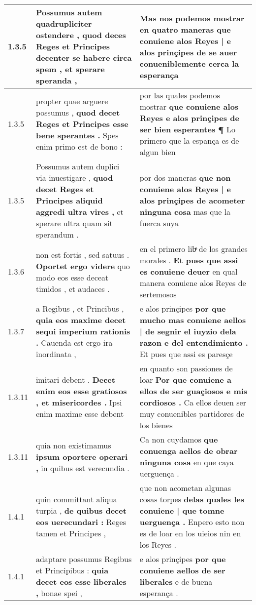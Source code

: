 \begin{tabular}{|p{1cm}|p{6.5cm}|p{6.5cm}|}
1.3.5 & Possumus autem quadrupliciter ostendere , \textbf{ quod deces Reges et Principes decenter se habere circa spem , } et sperare speranda , & Mas nos podemos mostrar en quatro maneras \textbf{ que conuiene alos Reyes | e alos prinçipes de se auer } conueniblemente cerca la esperança \\\hline
1.3.5 & propter quae arguere possumus , \textbf{ quod decet Reges et Principes esse bene sperantes . } Spes enim primo est de bono : & por las quales podemos mostrar \textbf{ que conuiene alos Reyes e alos prinçipes de ser bien esperantes ¶ } Lo primero que la espança es de algun bien \\\hline
1.3.5 & Possumus autem duplici via inuestigare , \textbf{ quod decet Reges et Principes aliquid aggredi ultra vires , } et sperare ultra quam sit sperandum . & por dos maneras \textbf{ que non conuiene alos Reyes | e alos prinçipes de acometer ninguna cosa } mas que la fuerca suya \\\hline
1.3.6 & non est fortis , sed satuus . \textbf{ Oportet ergo videre } quo modo eos esse deceat timidos , et audaces . & en el primero libͤ de los grandes morales . \textbf{ Et pues que assi es conuiene deuer } en qual manera conuiene alos Reyes de sertemosos \\\hline
1.3.7 & a Regibus , et Princibus , \textbf{ quia eos maxime decet sequi imperium rationis . } Cauenda est ergo ira inordinata , & e alos prinçipes \textbf{ por que mucho mas conuiene aellos | de segnir el iuyzio dela razon e del entendimiento . } Et pues que assi es paresçe \\\hline
1.3.11 & imitari debent . \textbf{ Decet enim eos esse gratiosos , et misericordes . } Ipsi enim maxime esse debent & en quanto son passiones de loar \textbf{ Por que conuiene a ellos de ser guaçiosos e mis cordiosos . } Ca ellos deuen ser muy conuenibles partidores de los bienes \\\hline
1.3.11 & quia non existimamus \textbf{ ipsum oportere operari , } in quibus est verecundia . & Ca non cuydamos \textbf{ que conuenga aellos de obrar ninguna cosa } en que caya uerguença . \\\hline
1.4.1 & quin committant aliqua turpia , \textbf{ de quibus decet eos uerecundari : } Reges tamen et Principes , & que non acometan algunas cosas torpes \textbf{ delas quales les conuiene | que tomne uerguença . } Enpero esto non es de loar en los uieios nin en los Reyes . \\\hline
1.4.1 & adaptare possumus Regibus et Principibus : \textbf{ quia decet eos esse liberales , } bonae spei , & e alos prinçipes \textbf{ por que conuiene aellos de ser liberales } e de buena esperança . \\\hline

\end{tabular}
